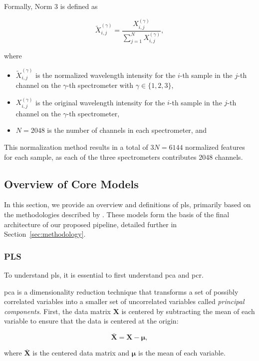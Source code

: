 Formally, Norm 3 is defined as

\begin{equation}
	\tilde{X}_{i,j}^{(\gamma)} = \frac{X_{i,j}^{(\gamma)}}{\sum_{j=1}^{N} X_{i,j}^{(\gamma)}},
\end{equation}

where

\begin{itemize}
	\item $\tilde{X}_{i,j}^{(\gamma)}$ is the normalized wavelength intensity for the $i$-th sample in the $j$-th channel on the $\gamma$-th spectrometer with $\gamma \in \{1, 2, 3\}$,
	\item $X_{i,j}^{(\gamma)}$ is the original wavelength intensity for the $i$-th sample in the $j$-th channel on the $\gamma$-th spectrometer,
	\item $N = 2048$ is the number of channels in each spectrometer, and
\end{itemize}

This normalization method results in a total of $3N = 6144$ normalized features for each sample, as each of the three spectrometers contributes 2048 channels.

\subsection{Overview of Core Models}
In this section, we provide an overview and definitions of \gls{pls}, primarily based on the methodologies described by \citet{James2023AnIS}.
These models form the basis of the final architecture of our proposed pipeline, detailed further in Section~\ref{sec:methodology}.

\subsubsection{PLS}
To understand \gls{pls}, it is essential to first understand \gls{pca} and \gls{pcr}.

\gls{pca} is a dimensionality reduction technique that transforms a set of possibly correlated variables into a smaller set of uncorrelated variables called \textit{principal components}.
First, the data matrix $\mathbf{X}$ is centered by subtracting the mean of each variable to ensure that the data is centered at the origin:

$$
\mathbf{\bar{X}} = \mathbf{X} - \mathbf{\mu},
$$

where $\mathbf{\bar{X}}$ is the centered data matrix and $\mathbf{\mu}$ is the mean of each variable.

